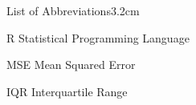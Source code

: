 \begin{mclistof}{List of Abbreviations}{3.2cm}

\item[R] Statistical Programming Language
\item[MSE] Mean Squared Error
\item[IQR] Interquartile Range

\end{mclistof} 
